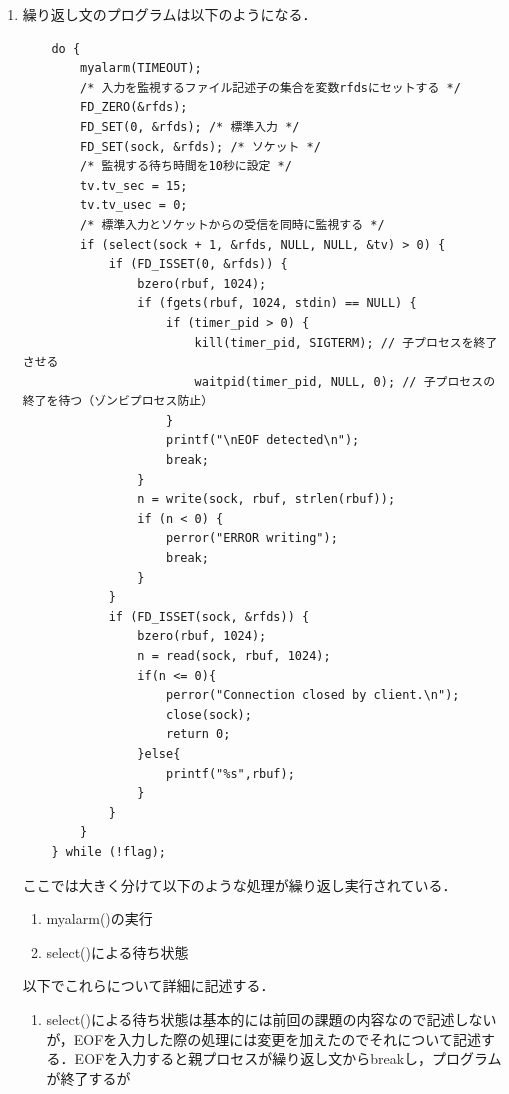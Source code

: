 \documentclass[dvipdfmx]{jarticle}
\begin{document}
\begin{enumerate}
\begin{lstlisting}
    /* ソケットをサーバに接続 */
    if (connect(sock, (struct sockaddr *)&svr, sizeof(svr)) < 0) {
        perror("client: connect");
        close(sock);
        exit(1);
    }
    printf("connected\n");
    \end{lstlisting}
    \item 繰り返し文のプログラムは以下のようになる．
    \begin{lstlisting}
    do {
        myalarm(TIMEOUT);
        /* 入力を監視するファイル記述子の集合を変数rfdsにセットする */
        FD_ZERO(&rfds);
        FD_SET(0, &rfds); /* 標準入力 */
        FD_SET(sock, &rfds); /* ソケット */
        /* 監視する待ち時間を10秒に設定 */
        tv.tv_sec = 15;
        tv.tv_usec = 0;
        /* 標準入力とソケットからの受信を同時に監視する */
        if (select(sock + 1, &rfds, NULL, NULL, &tv) > 0) {
            if (FD_ISSET(0, &rfds)) {
                bzero(rbuf, 1024);
                if (fgets(rbuf, 1024, stdin) == NULL) {
                    if (timer_pid > 0) {
                        kill(timer_pid, SIGTERM); // 子プロセスを終了させる
                        waitpid(timer_pid, NULL, 0); // 子プロセスの終了を待つ（ゾンビプロセス防止）
                    }
                    printf("\nEOF detected\n");
                    break;
                }
                n = write(sock, rbuf, strlen(rbuf));
                if (n < 0) {
                    perror("ERROR writing");
                    break;
                }
            }
            if (FD_ISSET(sock, &rfds)) {
                bzero(rbuf, 1024);
                n = read(sock, rbuf, 1024);
                if(n <= 0){
                    perror("Connection closed by client.\n");
                    close(sock);
                    return 0;
                }else{
                    printf("%s",rbuf);
                }
            }
        }
    } while (!flag);
    \end{lstlisting}
    ここでは大きく分けて以下のような処理が繰り返し実行されている．
    \begin{enumerate}
        \item myalarm()の実行
        \item select()による待ち状態
    \end{enumerate}
    以下でこれらについて詳細に記述する．
    \begin{enumerate}
        \item select()による待ち状態は基本的には前回の課題の内容なので記述しないが，EOFを入力した際の処理には変更を加えたのでそれについて記述する．EOFを入力すると親プロセスが繰り返し文からbreakし，プログラムが終了するが

\end{enumerate}
\end{enumerate}
\end{document}
